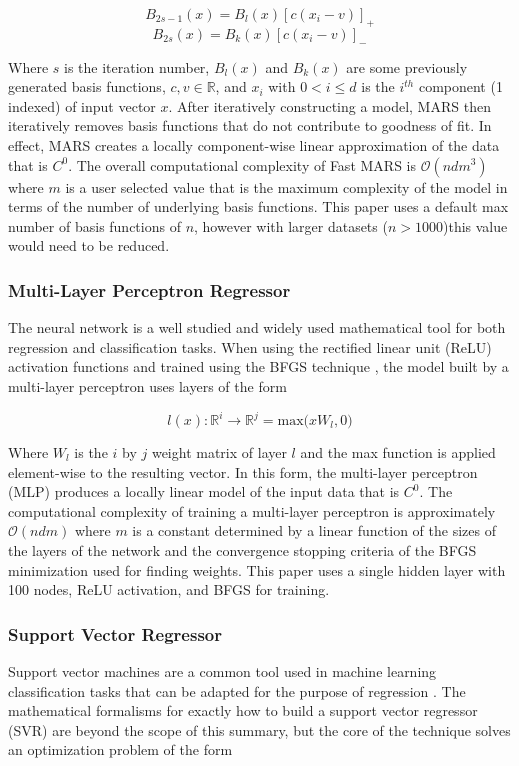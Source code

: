 \documentclass{scspaperproc}
\theoremstyle{scsthe}
\begin{document}
$$ B_{2s-1}(x) = B_l(x) [c(x_i-v)]_+ $$
$$ B_{2s}(x) = B_k(x) [c(x_i-v)]_- $$

Where $s$ is the iteration number, $B_l(x)$ and $B_k(x)$ are some
previously generated basis functions, $c, v \in \mathbb{R}$, and $x_i$
with $0 < i \leq d$ is the $i^{th}$ component (1 indexed) of input
vector $x$. After iteratively constructing a model, MARS then
iteratively removes basis functions that do not contribute to goodness
of fit. In effect, MARS creates a locally component-wise linear
approximation of the data that is $C^0$. The overall computational
complexity of Fast MARS is $\mathcal{O}(n d m^3)$ where $m$ is a user
selected value that is the maximum complexity of the model in terms of
the number of underlying basis functions. This paper uses a default
max number of basis functions of $n$, however with larger datasets ($n
> 1000$)this value would need to be reduced.

\subsubsection{Multi-Layer Perceptron Regressor}
The neural network is a well studied and widely used mathematical tool
for both regression and classification tasks.
\cite{hornik1989multilayer} When using the rectified linear unit
(ReLU) activation functions \cite{dahl2013improving} and trained using
the BFGS technique \cite{moller1993scaled}, the model built by a
multi-layer perceptron uses layers of the form

$$l(x) : \mathbb{R}^{i} \rightarrow \mathbb{R}^{j} = \text{max}\big( x
W_l, 0 \big)$$

Where $W_l$ is the $i$ by $j$ weight matrix of layer $l$ and the max
function is applied element-wise to the resulting vector. In this
form, the multi-layer perceptron (MLP) produces a locally linear model
of the input data that is $C^0$. The computational complexity of
training a multi-layer perceptron is approximately $\mathcal{O}(n d
m)$ where $m$ is a constant determined by a linear function of the
sizes of the layers of the network and the convergence stopping
criteria of the BFGS minimization used for finding weights. This paper
uses a single hidden layer with 100 nodes, ReLU activation, and BFGS
for training.

\subsubsection{Support Vector Regressor}
Support vector machines are a common tool used in machine learning
classification tasks that can be adapted for the purpose of regression
\cite{basak2007support}. The mathematical formalisms for exactly how
to build a support vector regressor (SVR) are beyond the scope of this
summary, but the core of the technique solves an optimization problem
of the form
\end{document}
